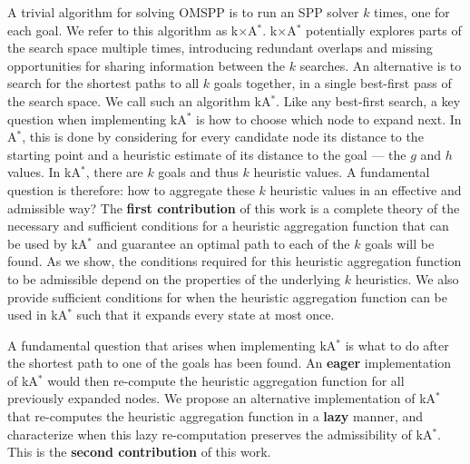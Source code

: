 \documentclass[smallextended]{svjour3}       %
\newcommand{\omspp}{\ac{OMSPP}\xspace}
\newcommand{\spp}{\ac{SPP}\xspace}
\newcommand{\astar}{A$^*$\xspace}
\newcommand{\kastar}{kA$^*$\xspace}
\newcommand{\kxastar}{k$\times$A$^*$\xspace}
\begin{document}
A trivial algorithm for solving \omspp is to run an \spp solver $k$ times, one for each goal. 
We refer to this algorithm as \kxastar. \kxastar potentially explores parts of the search space multiple times, introducing redundant overlaps and missing opportunities for sharing information between the $k$ searches. An alternative is to search for the shortest paths to all $k$ goals together, in a single best-first pass of the search space. We call such an algorithm \kastar. Like any best-first search, a key question when implementing \kastar is how to choose which node to expand next. 
In \astar{}, this is done by considering for every candidate node its distance to the starting point and a heuristic estimate of its distance to the goal --- the $g$ and $h$ values. In \kastar{}, there are $k$ goals and thus $k$ heuristic values. A fundamental question is therefore: how to aggregate these $k$ heuristic values in an effective and admissible way?
 The \textbf{first contribution} of this work is a complete theory of the necessary and sufficient conditions for a heuristic aggregation function that can be used by \kastar and guarantee an optimal path to each of the $k$ goals will be found. As we show, the conditions required for this heuristic aggregation function to be admissible depend on the properties of the underlying $k$ heuristics. 
{\color{red}
We also provide sufficient conditions for when the heuristic aggregation function can be used in \kastar such that it expands every state at most once.}


A fundamental question that arises when implementing \kastar is what to do after the shortest path to one of the goals has been found. An \textbf{eager} implementation of \kastar would then re-compute the heuristic aggregation function for all previously expanded nodes. We propose an alternative implementation of \kastar that re-computes the heuristic aggregation function in a \textbf{lazy} manner, and characterize when this lazy re-computation preserves the admissibility of \kastar. 
This is the \textbf{second contribution} of this work. 
\end{document}
